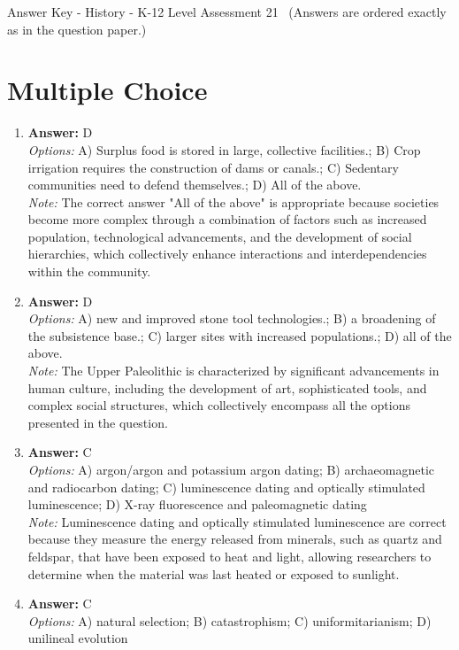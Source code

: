 \documentclass[12pt]{article}
\begin{document}
\begin{center}
Answer Key - History - K-12 Level Assessment 21 \
\small (Answers are ordered exactly as in the question paper.)
\end{center}

\section*{Multiple Choice}
\begin{enumerate}[label=\arabic*.]
\item \textbf{Answer:} D
\\ \textit{Options:} A) Surplus food is stored in large, collective facilities.; B) Crop irrigation requires the construction of dams or canals.; C) Sedentary communities need to defend themselves.; D) All of the above.
\\ \textit{Note:} The correct answer "All of the above" is appropriate because societies become more complex through a combination of factors such as increased population, technological advancements, and the development of social hierarchies, which collectively enhance interactions and interdependencies within the community.
\item \textbf{Answer:} D
\\ \textit{Options:} A) new and improved stone tool technologies.; B) a broadening of the subsistence base.; C) larger sites with increased populations.; D) all of the above.
\\ \textit{Note:} The Upper Paleolithic is characterized by significant advancements in human culture, including the development of art, sophisticated tools, and complex social structures, which collectively encompass all the options presented in the question.
\item \textbf{Answer:} C
\\ \textit{Options:} A) argon/argon and potassium argon dating; B) archaeomagnetic and radiocarbon dating; C) luminescence dating and optically stimulated luminescence; D) X-ray fluorescence and paleomagnetic dating
\\ \textit{Note:} Luminescence dating and optically stimulated luminescence are correct because they measure the energy released from minerals, such as quartz and feldspar, that have been exposed to heat and light, allowing researchers to determine when the material was last heated or exposed to sunlight.
\item \textbf{Answer:} C
\\ \textit{Options:} A) natural selection; B) catastrophism; C) uniformitarianism; D) unilineal evolution

\end{enumerate}
\end{document}
